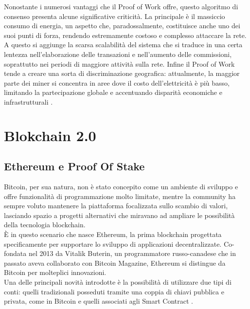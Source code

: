Nonostante i numerosi vantaggi che il Proof of Work offre, questo algoritmo di consenso presenta alcune significative criticità. La principale è il massiccio consumo di energia, un aspetto che, paradossalmente, costituisce anche uno dei suoi punti di forza, rendendo estremamente costoso e complesso attaccare la rete.
A questo si aggiunge la scarsa scalabilità del sistema che si traduce in una certa lentezza nell’elaborazione delle transazioni e nell’aumento delle commissioni, soprattutto nei periodi di maggiore attività sulla rete. Infine il Proof of Work tende a creare una sorta di discriminazione geografica: attualmente, la maggior parte dei miner si concentra in aree dove il costo dell’elettricità è più basso, limitando la partecipazione globale e accentuando disparità economiche e infrastrutturali \cite{Blockchain_tecnologia_e_applicazioni_per_il_business}.

\section{Blokchain 2.0}

\subsection{Ethereum e Proof Of Stake}
Bitcoin, per sua natura, non è stato concepito come un ambiente di sviluppo e offre funzionalità di programmazione molto limitate, mentre la community ha sempre voluto mantenere la piattaforma focalizzata sullo scambio di valori, lasciando spazio a progetti alternativi che miravano ad ampliare le possibilità della tecnologia blockchain.
\\È in questo scenario che nasce Ethereum, la prima blockchain progettata specificamente per supportare lo sviluppo di applicazioni decentralizzate. Co-fondata nel 2013 da Vitalik Buterin, un programmatore russo-canadese che in passato aveva collaborato con Bitcoin Magazine, Ethereum si distingue da Bitcoin per molteplici innovazioni.
\\Una delle principali novità introdotte è la possibilità di utilizzare due tipi di conti: quelli tradizionali posseduti tramite una coppia di chiavi pubblica e privata, come in Bitcoin e quelli associati agli Smart Contract \cite{Blockchain_guida_allecosistema}. 

